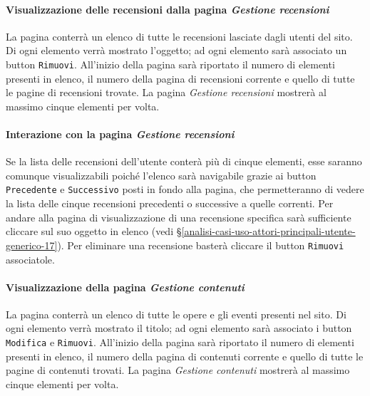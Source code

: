 \paragraph{Visualizzazione delle recensioni dalla pagina \textit{Gestione recensioni}}
\label{analisi-casi-uso-attori-principali-utente-amministratore-6}
La pagina conterrà un elenco di tutte le recensioni lasciate dagli utenti del sito. Di ogni elemento verrà mostrato l'oggetto; ad ogni elemento sarà associato un button \texttt{Rimuovi}. All'inizio della pagina sarà riportato il numero di elementi presenti in elenco, il numero della pagina di recensioni corrente e quello di tutte le pagine di recensioni trovate. La pagina \textit{Gestione recensioni} mostrerà al massimo cinque elementi per volta.


\paragraph{Interazione con la pagina \textit{Gestione recensioni}}
\label{analisi-casi-uso-attori-principali-utente-amministratore-7}
Se la lista delle recensioni dell'utente conterà più di cinque elementi, esse saranno comunque visualizzabili poiché l'elenco sarà navigabile grazie ai button \texttt{Precedente} e \texttt{Successivo} posti in fondo alla pagina, che permetteranno di vedere la lista delle cinque recensioni precedenti o successive a quelle correnti. Per andare alla pagina di visualizzazione di una recensione specifica sarà sufficiente cliccare sul suo oggetto in elenco (vedi §\ref{analisi-casi-uso-attori-principali-utente-generico-17}). Per eliminare una recensione basterà cliccare il button \texttt{Rimuovi} associatole.


\paragraph{Visualizzazione della pagina \textit{Gestione contenuti}}
\label{analisi-casi-uso-attori-principali-utente-amministratore-8}
La pagina conterrà un elenco di tutte le opere e gli eventi presenti nel sito. Di ogni elemento verrà mostrato il titolo; ad ogni elemento sarà associato i button  \texttt{Modifica} e \texttt{Rimuovi}. All'inizio della pagina sarà riportato il numero di elementi presenti in elenco, il numero della pagina di contenuti corrente e quello di tutte le pagine di contenuti trovati. La pagina \textit{Gestione contenuti} mostrerà al massimo cinque elementi per volta.


